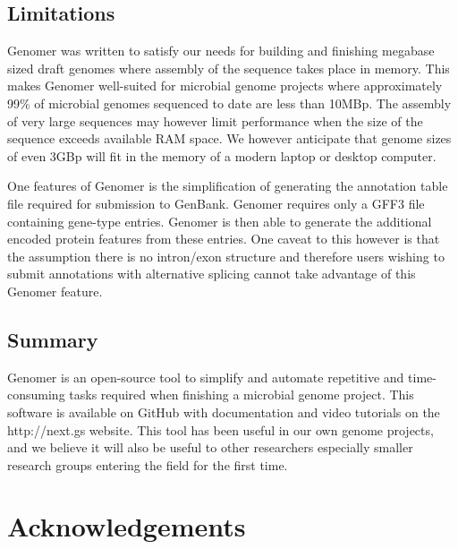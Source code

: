 \documentclass[10pt]{article}
\begin{document}
\subsection*{Limitations}

Genomer was written to satisfy our needs for building and finishing megabase
sized draft genomes where assembly of the sequence takes place in memory. This
makes Genomer well-suited for microbial genome projects where approximately
99\% of microbial genomes sequenced to date are less than 10MBp. The assembly
of very large sequences may however limit performance when the size of the
sequence exceeds available RAM space. We however anticipate that genome sizes
of even 3GBp will fit in the memory of a modern laptop or desktop computer.

One features of Genomer is the simplification of generating the annotation
table file required for submission to GenBank. Genomer requires only a GFF3
file containing gene-type entries. Genomer is then able to generate the
additional encoded protein features from these entries. One caveat to this
however is that the assumption there is no intron/exon structure and therefore
users wishing to submit annotations with alternative splicing cannot take
advantage of this Genomer feature.

\subsection*{Summary}

Genomer is an open-source tool to simplify and automate repetitive and
time-consuming tasks required when finishing a microbial genome project. This
software is available on GitHub \cite{genomer-github} with documentation and
video tutorials on the http://next.gs website. This tool has been useful in our
own genome projects, and we believe it will also be useful to other researchers
especially smaller research groups entering the field for the first time.

\section*{Acknowledgements}


\end{document}
